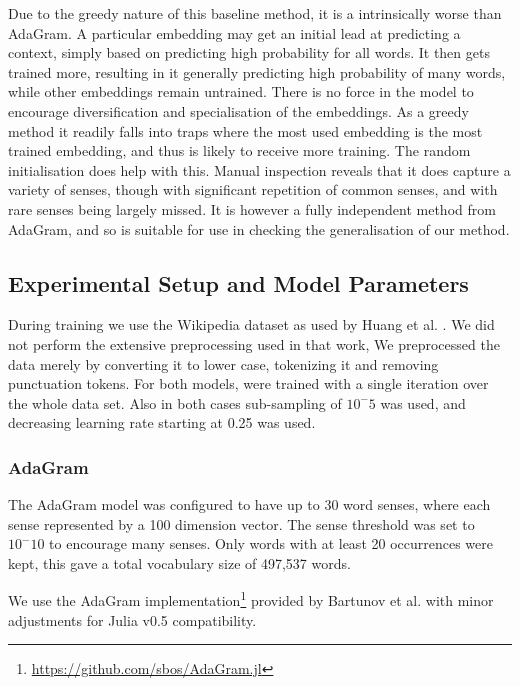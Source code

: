 \documentclass{sig-alternate}
\begin{document}
Due to the greedy nature of this baseline method, it is a intrinsically worse than AdaGram. A particular embedding may get an initial lead at predicting a context, simply based on predicting high probability for all words. It then gets trained more, resulting in it generally predicting high probability of many words, while other embeddings remain untrained. There is no force in the model to encourage diversification and specialisation of the embeddings. As a greedy method it readily falls into traps where the most used embedding is the most trained embedding, and thus is likely to receive more training. The random initialisation does help with this. Manual inspection reveals that it does capture a variety of senses, though with significant repetition of common senses, and with rare senses being largely missed. It is however a fully independent method from AdaGram, and so is suitable for use in checking the generalisation of our method.


\subsection{Experimental Setup and Model Parameters}
During training we use the Wikipedia dataset as used by Huang et al. \parencite{Huang2012}.
We did not perform the extensive preprocessing used in that work,
We preprocessed the data merely by converting it to lower case, tokenizing it and removing punctuation tokens.
For both models, were trained with a single iteration over the whole data set.
Also in both cases sub-sampling of $10^-5$ was used, and decreasing learning rate starting at 0.25 was used.


\subsubsection{AdaGram}
The AdaGram model was configured to have up to 30 word senses, where each sense represented by a 100 dimension vector. The sense threshold was set to $10^-10$ to encourage many senses.
Only words with at least 20 occurrences were kept, this gave a total vocabulary size of 497,537 words.

We use the AdaGram \parencite{AdaGrams} implementation\footnote{\url{https://github.com/sbos/AdaGram.jl}} provided by Bartunov et al. with minor adjustments for Julia \parencite{Julia} v0.5 compatibility.


\end{document}
